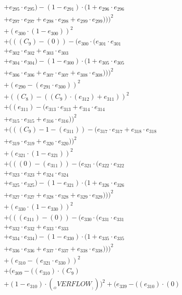 \documentclass[10pt, a4paper]{article}
\begin{document}
\begin{small}
\begin{align*}
& + e_{295} \cdot e_{295}) - (1 - e_{291}) \cdot (1 + e_{296} \cdot e_{296} \\
& + e_{297} \cdot e_{297} + e_{298} \cdot e_{298} + e_{299} \cdot e_{299})))^{2} \\
& + (e_{300} \cdot (1 - e_{300}))^{2} \\
& + (((C_{9}) - (0)) - (e_{300} \cdot (e_{301} \cdot e_{301} \\
& + e_{302} \cdot e_{302} + e_{303} \cdot e_{303} \\
& + e_{304} \cdot e_{304}) - (1 - e_{300}) \cdot (1 + e_{305} \cdot e_{305} \\
& + e_{306} \cdot e_{306} + e_{307} \cdot e_{307} + e_{308} \cdot e_{308})))^{2} \\
& + (e_{290} - (e_{291} \cdot e_{300}))^{2} \\
& + ((C_{8}) - ((C_{9})  \cdot  (e_{312}) + e_{311}))^{2} \\
& + ((e_{311}) - (e_{313} \cdot e_{313} + e_{314} \cdot e_{314} \\
& + e_{315} \cdot e_{315} + e_{316} \cdot e_{316}))^{2} \\
& + (((C_{9}) - 1 - (e_{311})) - (e_{317} \cdot e_{317} + e_{318} \cdot e_{318} \\
& + e_{319} \cdot e_{319} + e_{320} \cdot e_{320}))^{2} \\
& + (e_{321} \cdot (1 - e_{321}))^{2} \\
& + (((0) - (e_{311})) - (e_{321} \cdot (e_{322} \cdot e_{322} \\
& + e_{323} \cdot e_{323} + e_{324} \cdot e_{324} \\
& + e_{325} \cdot e_{325}) - (1 - e_{321}) \cdot (1 + e_{326} \cdot e_{326} \\
& + e_{327} \cdot e_{327} + e_{328} \cdot e_{328} + e_{329} \cdot e_{329})))^{2} \\
& + (e_{330} \cdot (1 - e_{330}))^{2} \\
& + (((e_{311}) - (0)) - (e_{330} \cdot (e_{331} \cdot e_{331} \\
& + e_{332} \cdot e_{332} + e_{333} \cdot e_{333} \\
& + e_{334} \cdot e_{334}) - (1 - e_{330}) \cdot (1 + e_{335} \cdot e_{335} \\
& + e_{336} \cdot e_{336} + e_{337} \cdot e_{337} + e_{338} \cdot e_{338})))^{2} \\
& + (e_{310} - (e_{321} \cdot e_{330}))^{2} \\
& + (e_{309} - ((e_{310})  \cdot  (C_{9}) \\
& + (1 - e_{310})  \cdot  (__OVERFLOW__)))^{2} + (e_{339} - ((e_{310}) \cdot (0) \\

\end{align*}
\end{small}
\end{document}

